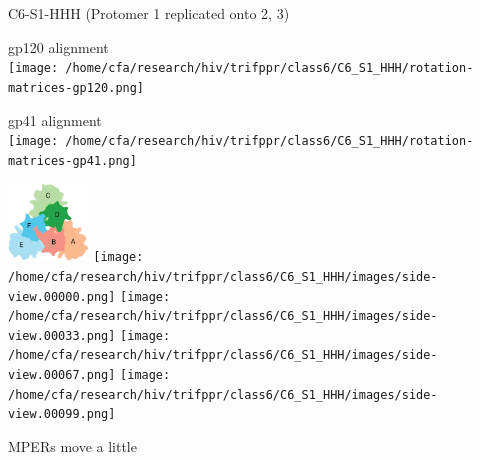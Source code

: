 \begin{frame}[fragile]{C6-S1-HHH (Protomer 1 replicated onto 2, 3)}
    \begin{center}
        \begin{minipage}{0.47\textwidth}
            \begin{center}
                gp120 alignment\\
                \texttt{[image: /home/cfa/research/hiv/trifppr/class6/C6\_S1\_HHH/rotation-matrices-gp120.png]}
            \end{center}
        \end{minipage}
        \begin{minipage}{0.47\textwidth}
            \begin{center}
                gp41 alignment\\
                \texttt{[image: /home/cfa/research/hiv/trifppr/class6/C6\_S1\_HHH/rotation-matrices-gp41.png]}
            \end{center}
        \end{minipage}

        \includegraphics[width=0.16\textwidth]{trimer_paint_bottom_sodroski_smol.png}
        \texttt{[image: /home/cfa/research/hiv/trifppr/class6/C6\_S1\_HHH/images/side-view.00000.png]}
        \texttt{[image: /home/cfa/research/hiv/trifppr/class6/C6\_S1\_HHH/images/side-view.00033.png]}
        \texttt{[image: /home/cfa/research/hiv/trifppr/class6/C6\_S1\_HHH/images/side-view.00067.png]}
        \texttt{[image: /home/cfa/research/hiv/trifppr/class6/C6\_S1\_HHH/images/side-view.00099.png]}

        MPERs move a little
    \end{center}
\end{frame}

